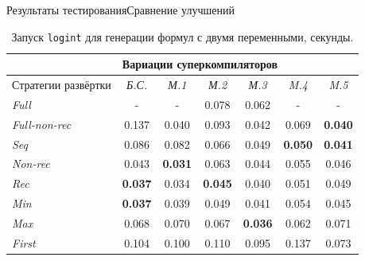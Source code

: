 \documentclass[xcolor=table]{beamer}
\begin{document}
\begin{frame}{Результаты тестирования}{\small Сравнение улучшений}

\begin{table}[h!]
\center
\begin{tabular}{|p{2.3cm}||c|c|c|c|c|c|}
\hline
                 & \multicolumn{6}{|l|}{Вариации суперкомпиляторов} \\ \hline
Стратегии развёртки &{\it Б.С.}&{\it М.1}&{\it М.2}&{\it М.3}&{\it M.4}&{\it M.5} \\ \hline \hline
{\it Full        }&    -        &    -        & 0.078       & 0.062      &    -        & - \\ \hline
{\it Full-non-rec}& 0.137       & 0.040       & 0.093       & 0.042      & 0.069       & {\bf 0.040} \\ \hline
{\it Seq         }& 0.086       & 0.082       & 0.066       & 0.049      & {\bf 0.050} & {\bf 0.041} \\ \hline
{\it Non-rec     }& 0.043       & {\bf 0.031} & 0.063       & 0.044      & 0.055       & 0.046 \\ \hline
{\it Rec         }& {\bf 0.037} & 0.034       & {\bf 0.045} & 0.040      & 0.051       & 0.049 \\ \hline
{\it Min         }& {\bf 0.037} & 0.039       & 0.049       & 0.041      & 0.054       & 0.045 \\ \hline
{\it Max         }& 0.068       & 0.070       & 0.067       &{\bf 0.036} & 0.062       & 0.071 \\ \hline
{\it First       }& 0.104       & 0.100       & 0.110       & 0.095      & 0.137       & 0.073 \\ \hline
\end{tabular}
\caption{Запуск \lstinline{logint} для генерации формул с двумя переменными, секунды.}
\label{fig:logintTest3}
\end{table}
\end{frame}
\end{document}
